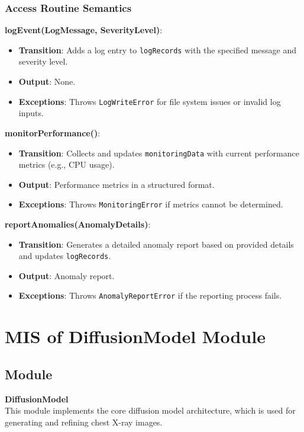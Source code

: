 \documentclass[12pt, titlepage]{article}
\begin{document}
\subsubsection{Access Routine Semantics}

\textbf{logEvent(LogMessage, SeverityLevel)}:
\begin{itemize}
    \item \textbf{Transition}: Adds a log entry to \texttt{logRecords} with the specified message and severity level.
    \item \textbf{Output}: None.
    \item \textbf{Exceptions}: Throws \texttt{LogWriteError} for file system issues or invalid log inputs.
\end{itemize}

\textbf{monitorPerformance()}:
\begin{itemize}
    \item \textbf{Transition}: Collects and updates \texttt{monitoringData} with current performance metrics (e.g., CPU usage).
    \item \textbf{Output}: Performance metrics in a structured format.
    \item \textbf{Exceptions}: Throws \texttt{MonitoringError} if metrics cannot be determined.
\end{itemize}

\textbf{reportAnomalies(AnomalyDetails)}:
\begin{itemize}
    \item \textbf{Transition}: Generates a detailed anomaly report based on provided details and updates \texttt{logRecords}.
    \item \textbf{Output}: Anomaly report.
    \item \textbf{Exceptions}: Throws \texttt{AnomalyReportError} if the reporting process fails.
\end{itemize}

\newpage
\section{MIS of DiffusionModel Module}

\subsection{Module}
\textbf{DiffusionModel} \\
This module implements the core diffusion model architecture, which is used for generating and refining chest X-ray images.
\end{document}
